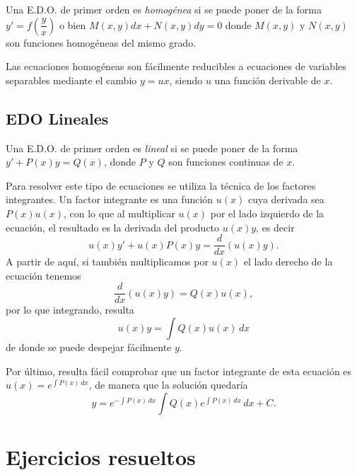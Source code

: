 Una E.D.O. de primer orden es \emph{homogénea} si se puede poner de la forma
$y'=f\left(\dfrac{y}{x}\right)$ o bien $M(x,y)dx+N(x,y)dy=0$ donde $M(x,y)$ y $N(x,y)$ son funciones homogéneas del mismo grado.

Las ecuaciones homogéneas son fácilmente reducibles a ecuaciones de variables separables mediante el cambio $y=ux$, siendo $u$ una función derivable de $x$.

\subsection{EDO Lineales}

Una E.D.O. de primer orden es \emph{lineal} si se puede poner de la forma $y'+ P(x)y = Q(x)$, donde $P$ y $Q$ son funciones continuas de $x$.

Para resolver este tipo de ecuaciones se utiliza la técnica de los
factores integrantes. Un factor integrante es una función $u(x)$
cuya derivada sea $P(x)u(x)$, con lo que al multiplicar $u(x)$ por
el lado izquierdo de la ecuación, el resultado es la derivada del
producto $u(x)y$, es decir
\[
u(x)y'+u(x)P(x)y=\frac{d}{dx}(u(x)y).
\]
A partir de aquí, si también multiplicamos por $u(x)$ el lado derecho de la ecuación tenemos
\[
\frac{d}{dx}(u(x)y)=Q(x)u(x),
\]
por lo que integrando, resulta
\[
u(x)y=\int Q(x)u(x)\,dx
\]
de donde se puede despejar fácilmente $y$.

Por último, resulta fácil comprobar que un factor integrante de esta ecuación es $u(x)=e^{\int P(x)\, dx}$, de manera que la solución quedaría
\[
y=e^{-\int P(x)\,dx}\int Q(x)e^{\int P(x)\,dx}\,dx+C.
\]




\newpage

\section{Ejercicios resueltos}

